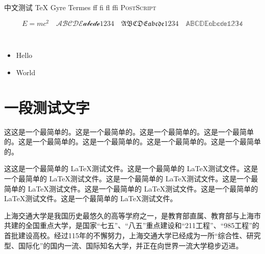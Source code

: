 \documentclass[12pt,a4paper,UTF8,adobefonts]{ctexbook}
\begin{document}
中文测试 TeX Gyre Termes ff fi fl ffi \textsc{PostScript} %

\begin{displaymath}
  E=mc^2 \quad \mathscr{ABCDE abcde 1234} \quad \mathfrak{ABCDE abcde 1234} \quad \mathbb{ABCDE abcde 1234}
\end{displaymath}

\begin{figure}
  \centering
  \hspace{1in}
  \\ %
  \hspace{1in}
\end{figure}

\begin{itemize}
\item Hello
\item World
\end{itemize}

\section{一段测试文字}

这这是一个最简单的。这是一个最简单的。这是一个最简单的。这是一个最简单的。这是一个最简单的。这是一个最简单的。这是一个最简单的。这是一个最简单的。

这这是一个最简单的 \LaTeX 测试文件。这是一个最简单的 \LaTeX 测试文件。这是一个最简单的 \LaTeX 测试文件。这是一个最简单的 \LaTeX 测试文件。这是一个最简单的 \LaTeX 测试文件。这是一个最简单的 \LaTeX 测试文件。这是一个最简单的 \LaTeX 测试文件。这是一个最简单的 \LaTeX 测试文件。

上海交通大学是我国历史最悠久的高等学府之一，是教育部直属、教育部与上海市共建的全国重点大学，是国家``七五''、``八五''重点建设和``211工程''、``985工程''的首批建设高校。经过115年的不懈努力，上海交通大学已经成为一所``综合性、研究型、国际化''的国内一流、国际知名大学，并正在向世界一流大学稳步迈进。 
\end{document}
